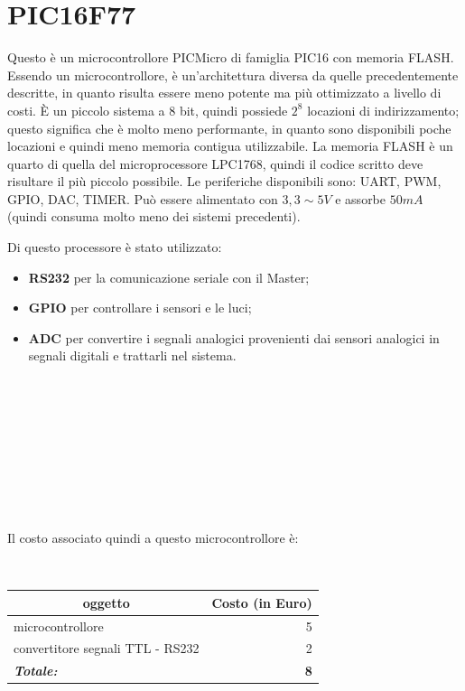 \documentclass[a4paper,titlepage]{book}
\begin{document}
\section{PIC16F77}
Questo è un microcontrollore PICMicro di famiglia PIC16 con memoria FLASH. Essendo un microcontrollore, è un'architettura diversa da quelle precedentemente descritte, in quanto risulta essere meno potente ma più ottimizzato a livello di costi. È un piccolo sistema a 8 bit, quindi possiede $2^8$ locazioni di indirizzamento; questo significa che è molto meno performante, in quanto sono disponibili poche locazioni e quindi meno memoria contigua utilizzabile. La memoria FLASH è un quarto di quella del microprocessore LPC1768, quindi il codice scritto deve risultare il più piccolo possibile. Le periferiche disponibili sono: UART, PWM, GPIO, DAC, TIMER. Può essere alimentato con $3,3 \sim 5 V$ e assorbe $50 mA$ (quindi consuma molto meno dei sistemi precedenti).

Di questo processore è stato utilizzato:

\begin{itemize}[noitemsep,topsep=10pt,parsep=23pt,partopsep=0pt]
\item \textbf{RS232} per la comunicazione seriale con il Master;
\item \textbf{GPIO} per controllare i sensori e le luci;
\item \textbf{ADC} per convertire i segnali analogici provenienti dai sensori analogici in segnali digitali e trattarli nel sistema.
\end{itemize}
 

~

~

~

~

~


Il costo associato quindi a questo microcontrollore è:

~



\begin{tabular}{|l  r|}
\hline
\multicolumn{1}{|c|}{\textbf {oggetto}} & \multicolumn{1}{c|}{\textbf {Costo (in Euro)}} \\
\hline

microcontrollore			& 5 \\
convertitore segnali TTL - RS232 	& 2  \\
\hline
\hline

\textit{\textbf{Totale:}}		& \textbf{8} \\

\hline
\end{tabular}
\end{document}
